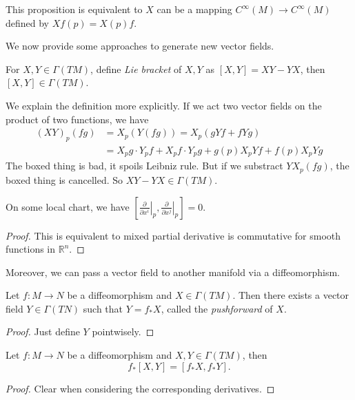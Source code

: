 \begin{rem}
    This proposition is equivalent to $X$ can be a mapping $C^\infty(M)\to C^\infty(M)$ defined by $Xf(p)=X(p)f$.
\end{rem}

We now provide some approaches to generate new vector fields.

\begin{defn}
    For $X,Y\in\Gamma(TM)$, define \emph{Lie bracket} of $X,Y$ as $[X,Y]=XY-YX$, then $[X,Y]\in\Gamma(TM)$.
\end{defn}
\begin{rem}
    We explain the definition more explicitly.
    If we act two vector fields on the product of two functions, we have
    \begin{align*}
        (XY)_p(fg)&=X_p(Y(fg))=X_p(gYf+fYg)\\
        &=\boxed{X_pg\cdot Y_pf+X_pf\cdot Y_pg}+g(p)X_pYf+f(p)X_pYg
    \end{align*}
    The boxed thing is bad, it spoils Leibniz rule.
    But if we substract $YX_p(fg)$, the boxed thing is cancelled.
    So $XY-YX\in\Gamma(TM)$.
\end{rem}

\begin{prop}
    On some local chart, we have $\left[\left.\frac{\partial{}}{\partial{x^i}}\right|_p,\left.\frac{\partial{}}{\partial{x^j}}\right|_p\right]=0$.
\end{prop}
\begin{proof}
    This is equivalent to mixed partial derivative is commutative for smooth functions in $\mathbb{R}^n$.
\end{proof}

Moreover, we can pass a vector field to another manifold via a diffeomorphism.

\begin{prop}
    Let $f:M\to N$ be a diffeomorphism and $X\in\Gamma(TM)$.
    Then there exists a vector field $Y\in\Gamma(TN)$ such that $Y=f_*X$, called the \emph{pushforward} of $X$.
\end{prop}
\begin{proof}
    Just define $Y$ pointwisely.
\end{proof}

\begin{prop}
    Let $f:M\to N$ be a diffeomorphism and $X,Y\in\Gamma(TM)$, then
    \[f_*[X,Y]=[f_*X,f_*Y].\]
\end{prop}
\begin{proof}
    Clear when considering the corresponding derivatives.
\end{proof}

